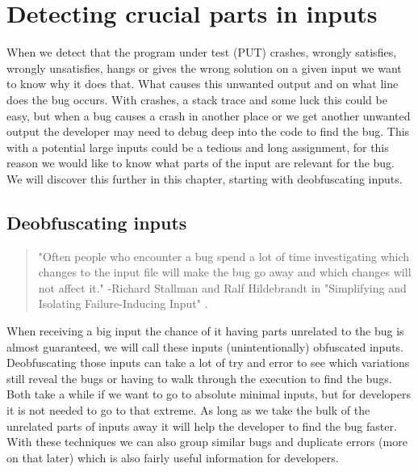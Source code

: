 \chapter{Detecting crucial parts in inputs}
\label{inputReduction:intro}
When we detect that the program under test (PUT) crashes, wrongly satisfies, wrongly unsatisfies, hangs or gives the wrong solution on a given input we want to know why it does that. What causes this unwanted output and on what line does the bug occurs. With crashes, a stack trace and some luck this could be easy, but when a bug causes a crash in another place or we get another unwanted output the developer may need to debug deep into the code to find the bug. This with a potential large inputs could be a tedious and long assignment, for this reason we would like to know what parts of the input are relevant for the bug. We will discover this further in this chapter, starting with deobfuscating inputs.

\section{Deobfuscating inputs}
\label{inputReduction:Deobfuscating}
\begin{quote}
	"Often people who encounter a bug spend a lot of time investigating which changes to the input file will make the bug go away and which changes will not affect it." 
	\newline
	-Richard Stallman and Ralf Hildebrandt in "Simplifying and Isolating Failure-Inducing Input" \cite{5zeller2002simplifyingIsolatingFailure-inducing}.
\end{quote} 
When receiving a big input the chance of it having parts unrelated to the bug is almost guaranteed, we will call these inputs (unintentionally) obfuscated inputs. Deobfuscating those inputs can take a lot of try and error to see which variations still reveal the bugs or having to walk through the execution to find the bugs. Both take a while if we want to go to absolute minimal inputs, but for developers it is not needed to go to that extreme. As long as we take the bulk of the unrelated parts of inputs away it will help the developer to find the bug faster. With these techniques we can also group similar bugs and duplicate errors (more on that later) which is also fairly useful information for developers.

